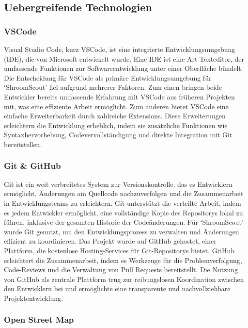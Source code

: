 \documentclass[../main.tex]{subfiles} %
\begin{document}
\subsection{Uebergreifende Technologien} %

\subsubsection{VSCode}

Visual Studio Code, kurz VSCode, ist eine integrierte Entwicklungsumgebung (IDE), die von Microsoft entwickelt wurde. Eine IDE ist eine 
Art Texteditor, der umfassende Funktionen zur Softwareentwicklung unter einer Oberfläche bündelt. Die Entscheidung für VSCode als primäre 
Entwicklungsumgebung für `ShroomScout' fiel aufgrund mehrerer Faktoren. Zum einen bringen beide Entwickler bereits umfassende Erfahrung
mit VSCode aus früheren Projekten mit, was eine effiziente Arbeit ermöglicht. Zum anderen bietet VSCode eine einfache Erweiterbarkeit durch 
zahlreiche Extensions. Diese Erweiterungen erleichtern die Entwicklung erheblich, indem sie zusätzliche Funktionen wie Syntaxhervorhebung, 
Codevervollständigung und direkte Integration mit Git bereitstellen.

\subsubsection{Git \& GitHub}

Git ist ein weit verbreitetes System zur Versionskontrolle, das es Entwicklern ermöglicht, Änderungen am Quellcode nachzuverfolgen
und die Zusammenarbeit in Entwicklungsteams zu erleichtern. Git unterstützt die verteilte Arbeit, indem es jedem Entwickler ermöglicht,
eine vollständige Kopie des Repositorys lokal zu führen, inklusive der gesamten Historie der Codeänderungen. Für `ShroomScout' wurde
Git genutzt, um den Entwicklungsprozess zu verwalten und Änderungen effizient zu koordinieren. Das Projekt wurde auf GitHub gehostet,
einer Plattform, die kostenlose Hosting-Services für Git-Repositorys bietet. GitHub erleichtert die Zusammenarbeit, indem es Werkzeuge
für die Problemverfolgung, Code-Reviews und die Verwaltung von Pull Requests bereitstellt. Die Nutzung von GitHub als zentrale Plattform
trug zur reibungslosen Koordination zwischen den Entwicklern bei und ermöglichte eine transparente und nachvollziehbare Projektentwicklung.

\subsubsection{Open Street Map}
\end{document}
